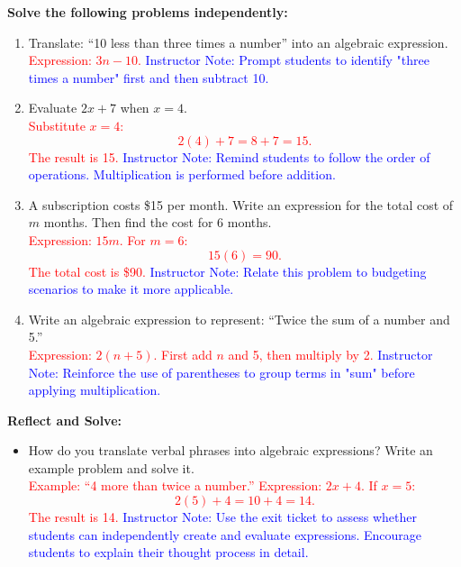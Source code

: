 \documentclass[12pt]{article}
\begin{document}
\begin{tcolorbox}[colframe=black!60, colback=white, 
coltitle=black, colbacktitle=black!15, fonttitle=\bfseries\Large, 
title=Independent Practice, halign title=center, left=10pt, right=10pt, top=10pt, bottom=15pt]
\textbf{Solve the following problems independently:}
\begin{enumerate}[itemsep=3em]
    \item Translate: “10 less than three times a number” into an algebraic expression. \\
    \textcolor{red}{Expression: \( 3n - 10 \).}
    \textcolor{blue}{Instructor Note: Prompt students to identify "three times a number" first and then subtract 10.}

    \item Evaluate \( 2x + 7 \) when \( x = 4 \). \\
    \textcolor{red}{Substitute \( x = 4 \): 
    \[
    2(4) + 7 = 8 + 7 = 15.
    \]
    The result is 15.}
    \textcolor{blue}{Instructor Note: Remind students to follow the order of operations. Multiplication is performed before addition.}

    \item A subscription costs \$15 per month. Write an expression for the total cost of \( m \) months. Then find the cost for 6 months. \\
    \textcolor{red}{Expression: \( 15m \). For \( m = 6 \): 
    \[
    15(6) = 90.
    \]
    The total cost is \$90.}
    \textcolor{blue}{Instructor Note: Relate this problem to budgeting scenarios to make it more applicable.}

    \item Write an algebraic expression to represent: “Twice the sum of a number and 5.” \\
    \textcolor{red}{Expression: \( 2(n + 5) \). First add \( n \) and 5, then multiply by 2.}
    \textcolor{blue}{Instructor Note: Reinforce the use of parentheses to group terms in "sum" before applying multiplication.}
\end{enumerate}
\end{tcolorbox}

\begin{tcolorbox}[colframe=black!60, colback=white, 
coltitle=black, colbacktitle=black!15, fonttitle=\bfseries\Large, 
title=Exit Ticket, halign title=center, left=10pt, right=10pt, top=10pt, bottom=15pt]
\textbf{Reflect and Solve:}
\begin{itemize}
    \item How do you translate verbal phrases into algebraic expressions? Write an example problem and solve it. \\
    \textcolor{red}{Example: “4 more than twice a number.” Expression: \( 2x + 4 \). If \( x = 5 \): 
    \[
    2(5) + 4 = 10 + 4 = 14.
    \]
    The result is 14.}
    \textcolor{blue}{Instructor Note: Use the exit ticket to assess whether students can independently create and evaluate expressions. Encourage students to explain their thought process in detail.}
\end{itemize}
\end{tcolorbox}
\end{document}
